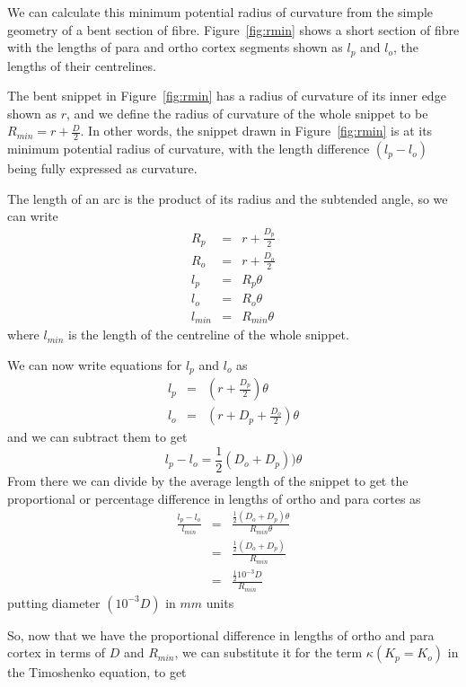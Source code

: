 \documentclass[titlepage]{article}  %
\begin{document}
We can calculate this minimum potential radius of curvature from the simple geometry of a bent section of fibre. Figure~\ref{fig:rmin} shows a short section of fibre with the lengths of para and ortho cortex segments shown as $l_{p}$ and $l_{o}$, the lengths of their centrelines.

The bent snippet in Figure~\ref{fig:rmin} has a radius of curvature of its inner edge shown as $r$, and we define the radius of curvature of the whole snippet to be $R_{min} = r + \frac{D}{2}$.  In other words, the snippet drawn in Figure~\ref{fig:rmin} is at its minimum potential radius of curvature, with the length difference $(l_{p} - l_{o})$ being fully expressed as curvature.

The length of an arc is the product of its radius and the subtended angle, so we can write
\begin{eqnarray*}
R_{p} & = & r + \frac{D_{p}}{2} \\
R_{o} & = & r + \frac{D_{o}}{2} \\
l_{p} & = & R_{p} \theta \\
l_{o} & = & R_{o} \theta \\
l_{min} & = & R_{min} \theta
\end{eqnarray*}
where $l_{min}$ is the length of the centreline of the whole snippet.

We can now write equations for $l_{p}$ and $l_{o}$ as
\begin{eqnarray*}
l_{p} & = & \left( r  + \frac{D_{p}}{2} \right) \theta  \\
l_{o} & = & \left( r  + D_{p} + \frac{D_{o}}{2} \right) \theta
\end{eqnarray*}
and we can subtract them to get
\begin{displaymath}
l_{p} - l_{o} = \frac{1}{2}(D_{o} + D_{p})) \theta
\end{displaymath}
From there we can divide by the average length of the snippet to get the proportional or percentage difference in lengths of ortho and para cortes as
\begin{eqnarray*}
\frac{l_{p} - l_{o}}{l_{min}} & =  & \frac{\frac{1}{2}(D_{o} + D_{p}) \theta}{R_{min} \theta} \\
       & = & \frac{\frac{1}{2}(D_{o} + D_{p})}{R_{min}} \\
       & = & \frac{\frac{1}{2}10^{-3}D}{R_{min}}
\end{eqnarray*}
putting diameter $(10^{-3}D)$ in $mm$ units

So, now that we have the proportional difference in lengths of ortho and para cortex in terms of $D$ and $R_{min}$, we can substitute it for the term $\kappa (K_{p} = K_{o})$ in the Timoshenko equation, to get 
\end{document}
